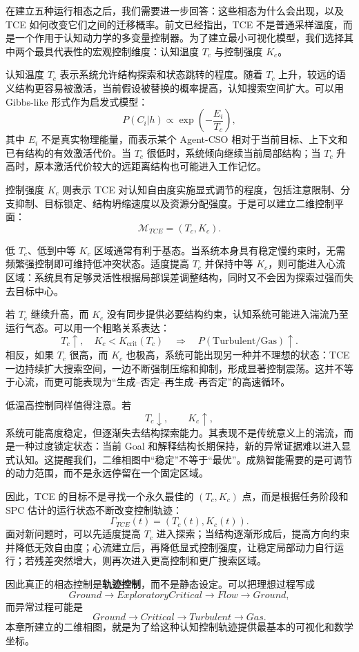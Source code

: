 在建立五种运行相态之后，我们需要进一步回答：这些相态为什么会出现，以及 TCE 如何改变它们之间的迁移概率。前文已经指出，TCE 不是普通采样温度，而是一个作用于认知动力学的多变量控制器。为了建立最小可视化模型，我们选择其中两个最具代表性的宏观控制维度：认知温度 $T_c$ 与控制强度 $K_c$。

认知温度 $T_c$ 表示系统允许结构探索和状态跳转的程度。随着 $T_c$ 上升，较远的语义结构更容易被激活，当前假设被替换的概率提高，认知搜索空间扩大。可以用 Gibbs-like 形式作为启发式模型：
\[
P(C_i|h)
\propto
\exp
\left(
-\frac{E_i}{T_c}
\right),
\]
其中 $E_i$ 不是真实物理能量，而表示某个 Agent-CSO 相对于当前目标、上下文和已有结构的有效激活代价。当 $T_c$ 很低时，系统倾向继续当前局部结构；当 $T_c$ 升高时，原本激活代价较大的远距离结构也可能进入工作记忆。

控制强度 $K_c$ 则表示 TCE 对认知自由度实施显式调节的程度，包括注意限制、分支抑制、目标锁定、结构坍缩速度以及资源分配强度。于是可以建立二维控制平面：
\[
\boxed{
\mathcal M_{TCE}
=
(T_c,K_c)
}.
\]

低 $T_c$、低到中等 $K_c$ 区域通常有利于基态。当系统本身具有稳定慢约束时，无需频繁强控制即可维持低冲突状态。适度提高 $T_c$ 并保持中等 $K_c$，则可能进入心流区域：系统具有足够灵活性根据局部误差调整结构，同时又不会因为探索过强而失去目标中心。

若 $T_c$ 继续升高，而 $K_c$ 没有同步提供必要结构约束，认知系统可能进入湍流乃至运行气态。可以用一个粗略关系表达：
\[
T_c\uparrow,
\quad
K_c<K_{\mathrm{crit}}(T_c)
\quad\Rightarrow\quad
P(\mathrm{Turbulent/Gas})\uparrow.
\]
相反，如果 $T_c$ 很高，而 $K_c$ 也极高，系统可能出现另一种并不理想的状态：TCE 一边持续扩大搜索空间，一边不断强制压缩和抑制，形成显著控制震荡。这并不等于心流，而更可能表现为“生成--否定--再生成--再否定”的高速循环。

低温高控制同样值得注意。若
\[
T_c\downarrow,\qquad K_c\uparrow,
\]
系统可能高度稳定，但逐渐失去结构探索能力。其表现不是传统意义上的湍流，而是一种过度锁定状态：当前 Goal 和解释结构长期保持，新的异常证据难以进入显式认知。这提醒我们，二维相图中“稳定”不等于“最优”。成熟智能需要的是可调节的动力范围，而不是永远停留在一个固定区域。

因此，TCE 的目标不是寻找一个永久最佳的 $(T_c,K_c)$ 点，而是根据任务阶段和 SPC 估计的运行状态不断改变控制轨迹：
\[
\Gamma_{TCE}(t)
=
(T_c(t),K_c(t)).
\]
面对新问题时，可以先适度提高 $T_c$ 进入探索；当结构逐渐形成后，提高方向约束并降低无效自由度；心流建立后，再降低显式控制强度，让稳定局部动力自行运行；若残差突然增大，则再次进入更高控制和更广搜索区域。

因此真正的相态控制是\textbf{轨迹控制}，而不是静态设定。可以把理想过程写成
\[
Ground
\rightarrow
ExploratoryCritical
\rightarrow
Flow
\rightarrow
Ground,
\]
而异常过程可能是
\[
Ground
\rightarrow
Critical
\rightarrow
Turbulent
\rightarrow
Gas.
\]
本章所建立的二维相图，就是为了给这种认知控制轨迹提供最基本的可视化和数学坐标。

